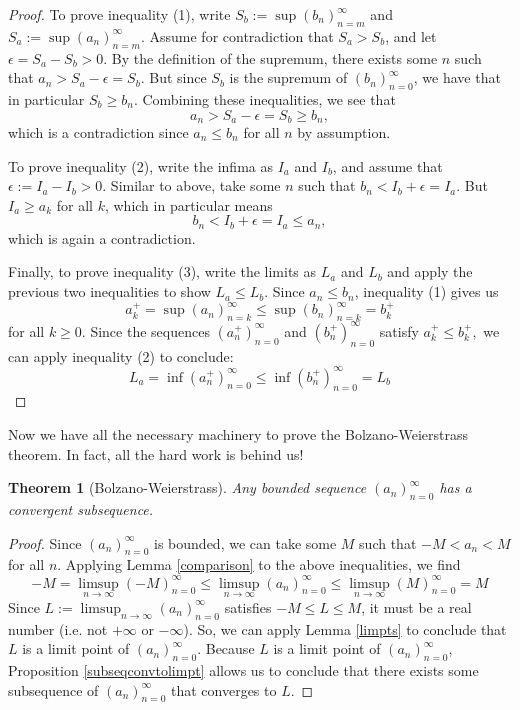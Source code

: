 \documentclass[11pt, oneside]{article}
\newtheorem*{theorem}{Theorem}
\theoremstyle{definition}
\begin{document}
\begin{proof}
    To prove inequality (1), write $S_b := \sup (b_n)_{n=m}^\infty$ and $S_a := \sup (a_n)_{n=m}^\infty$.
    Assume for contradiction that $S_a > S_b$, and let $\epsilon = S_a - S_b > 0$.
    By the definition of the supremum, there exists some $n$ such that $a_n > S_a - \epsilon = S_b$. But since $S_b$ is the supremum of $(b_n)_{n=0}^\infty$, we have
    that in particular $S_b \geq b_n$. Combining these inequalities, we see that
    $$a_n > S_a - \epsilon = S_b \geq b_n,$$
    which is a contradiction since $a_n \leq b_n$ for all $n$ by assumption.

    To prove inequality (2), write the infima as $I_a$ and $I_b$, and assume that $\epsilon := I_a - I_b > 0$.
    Similar to above, take some $n$ such that $b_n < I_b + \epsilon = I_a$. But $I_a \geq a_k$ for all $k$, which in particular means
    $$b_n < I_b + \epsilon = I_a \leq a_n,$$
    which is again a contradiction.

    Finally, to prove inequality (3), write the limits as $L_a$ and $L_b$ and apply the previous two inequalities to show $L_a \leq L_b$.
    Since $a_n \leq b_n$, inequality (1) gives us
    $$a_k^+ = \sup (a_n)_{n=k}^\infty \leq \sup (b_n)_{n=k}^\infty = b_k^+$$
    for all $k \geq 0$. Since the sequences $(a_n^+)_{n=0}^\infty$ and $(b_n^+)_{n=0}^\infty$ satisfy $a_k^+ \leq b_k^+,$ we can apply inequality (2) to conclude:
    $$L_a = \inf (a_n^+)_{n=0}^\infty \leq \inf (b_n^+)_{n=0}^\infty = L_b$$
\end{proof}

Now we have all the necessary machinery to prove the Bolzano-Weierstrass theorem. In fact, all the hard work is behind us!
\begin{theorem}[Bolzano-Weierstrass]
    Any bounded sequence $(a_n)_{n=0}^\infty$ has a convergent subsequence.
\end{theorem}

\begin{proof}
    Since $(a_n)_{n=0}^\infty$ is bounded, we can take some $M$ such that $-M < a_n < M$ for all $n$.
    Applying Lemma \ref{comparison} to the above inequalities, we find
    $$-M = \limsup_{n \rightarrow \infty} (-M)_{n=0}^\infty \leq \limsup_{n \rightarrow \infty} (a_n)_{n=0}^\infty \leq \limsup_{n \rightarrow \infty} (M)_{n=0}^\infty = M$$
    Since $L := \limsup_{n \rightarrow \infty} (a_n)_{n=0}^\infty$ satisfies $-M \leq L \leq M$, it must be a real number (i.e. not $+\infty$ or $-\infty$).
    So, we can apply Lemma \ref{limpts} to conclude that $L$ is a limit point of $(a_n)_{n=0}^\infty$.
    Because $L$ is a limit point of $(a_n)_{n=0}^\infty$, Proposition \ref{subseqconvtolimpt} allows us to conclude that there exists some subsequence of $(a_n)_{n=0}^\infty$ that converges to $L$.
\end{proof}
\end{document}
